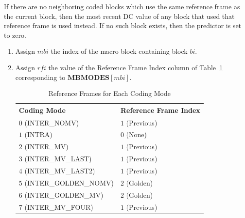 \documentclass[9pt,letterpaper]{book}
\newcommand{\idx}[1]{{\ensuremath{\mathit{#1}}}}
\newcommand{\bi}{\idx{bi}}
\newcommand{\mbi}{\idx{mbi}}
\newcommand{\rfi}{\idx{rfi}}
\newcommand{\bitvar}[1]{\ensuremath{\mathbf{\bm{#1}}}}
\newcommand{\locvar}[1]{\ensuremath{\mathrm{#1}}}
\numberwithin{equation}{chapter}
\numberwithin{figure}{chapter}
\numberwithin{table}{chapter}
\begin{document}
If there are no neighboring coded blocks which use the same reference frame as
 the current block, then the most recent DC value of any block that used that
 reference frame is used instead.
If no such block exists, then the predictor is set to zero.

\begin{enumerate}
\item
Assign \locvar{\mbi} the index of the macro block containing block
 \bitvar{\bi}.
\item
Assign \locvar{\rfi} the value of the Reference Frame Index column of
 Table~\ref{tab:cm-refs} corresponding to $\bitvar{MBMODES}[\locvar{\mbi}]$.

\begin{table}[htpb]
\begin{center}
\begin{tabular}{ll}\toprule
Coding Mode               & Reference Frame Index \\\midrule
$0$ (INTER\_NOMV)         & $1$ (Previous)        \\
$1$ (INTRA)               & $0$ (None)            \\
$2$ (INTER\_MV)           & $1$ (Previous)        \\
$3$ (INTER\_MV\_LAST)     & $1$ (Previous)        \\
$4$ (INTER\_MV\_LAST2)    & $1$ (Previous)        \\
$5$ (INTER\_GOLDEN\_NOMV) & $2$ (Golden)          \\
$6$ (INTER\_GOLDEN\_MV)   & $2$ (Golden)          \\
$7$ (INTER\_MV\_FOUR)     & $1$ (Previous)        \\
\bottomrule\end{tabular}
\end{center}
\caption{Reference Frames for Each Coding Mode}
\label{tab:cm-refs}
\end{table}


\end{enumerate}
\end{document}
